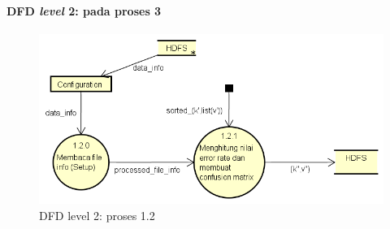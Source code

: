 \paragraph{DFD \textit{level} 2: pada proses 3}
\begin{figure}[H]
	\centering
	\includegraphics[scale=0.6]{Diagram/DFD_1_3_Testing_Red}
	\caption[DFD level 2: proses 1.2]{DFD level 2: proses 1.2}
	\label{fig:DFD level 2: proses 1.2}
\end{figure}

